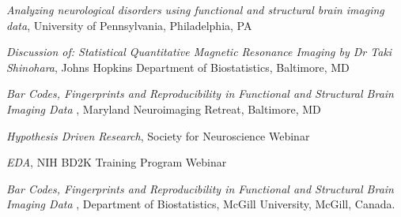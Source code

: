 \documentclass[12pt]{article}
\begin{document}
\begin{description}
\begin{description}
	\end{description}
\item[\textnormal{2015}]     
    \begin{description}
	\item {\it Analyzing neurological disorders using functional and structural brain imaging data}, University of Pennsylvania, Philadelphia, PA
	\item {\it Discussion of: Statistical Quantitative Magnetic Resonance Imaging by Dr Taki Shinohara}, Johns Hopkins Department of Biostatistics, Baltimore, MD
	\end{description}
\item[\textnormal{2016}]
    \begin{description}
        \item {\it Bar Codes, Fingerprints and Reproducibility in Functional and Structural Brain Imaging Data }, Maryland Neuroimaging Retreat, Baltimore, MD
        \item {\it Hypothesis Driven Research}, Society for Neuroscience Webinar
        \item {\it EDA}, NIH BD2K Training Program Webinar
    \end{description}
\item[\textnormal{2017}] 
    \begin{description}
        \item {\it Bar Codes, Fingerprints and Reproducibility in Functional and Structural Brain Imaging Data }, Department of Biostatistics, McGill University, McGill, Canada.
    \end{description}
\end{description}
\end{document}
